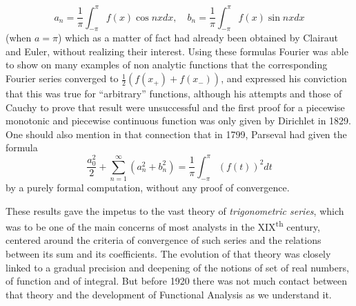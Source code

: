 \documentclass[12pt,a4paper,leqno,twoside]{extbook}
\newcommand{\supth}{\texorpdfstring{\textsuperscript{th}}{th}}
\begin{document}
\begin{equation}
    \label{eq:1.16}
    a_n = \frac{1}{\pi} \int_{-\pi}^\pi f(x)\cos{nx} dx, \quad b_n = \frac{1}{\pi} \int_{-\pi}^\pi f(x)\sin{nx} dx
\end{equation}
(when \(a = \pi\)) which as a matter of fact had already been obtained by Clairaut and Euler, without realizing their interest. Using these formulas Fourier was able to show on many examples of non analytic functions that the corresponding Fourier series converged to \(\frac{1}{2} \left(f(x_+) + f(x_-)\right)\), and expressed his conviction that this was true for ``arbitrary'' functions, although his attempts and those of Cauchy to prove that result were unsuccessful and the first proof for a piecewise monotonic and piecewise continuous function was only given by Dirichlet in 1829. One should also mention in that connection that in 1799, Parseval had given the formula
\begin{equation}
    \label{eq:1.17}
    \frac{a_0^2}{2} + \sum_{n=1}^\infty \left(a_n^2 + b_n^2\right) = \frac{1}{\pi} \int_{-\pi}^\pi \left(f(t)\right)^2 dt
\end{equation}
by a purely formal computation, without any proof of convergence.

These results gave the impetus to the vast theory of \emph{trigonometric series}, which was to be one of the main concerns of most analysts in the XIX\supth{} century, centered around the criteria of convergence of such series and the relations between its sum and its coefficients. The evolution of that theory was closely linked to a gradual precision and deepening of the notions of set of real numbers, of function and of integral. But before 1920 there was not much contact between that theory and the development of Functional Analysis as we understand it.
\end{document}
